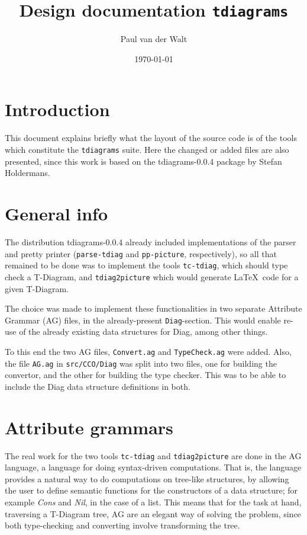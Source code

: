 \documentclass[a4paper]{article}
\title{Design documentation \texttt{tdiagrams}}
\date{\today}
\author{Paul van der Walt}
\begin{document}
\maketitle

\section{Introduction}

This document explains briefly what the layout of the source code is of the
tools which constitute the \texttt{tdiagrams} suite. Here the changed or added
files are also presented, since this work is based on the tdiagrams-0.0.4
package by Stefan Holdermans. 

\section{General info}

The distribution tdiagrams-0.0.4 already included implementations of the parser and pretty printer (\texttt{parse-tdiag} and \texttt{pp-picture}, respectively), so all that remained to be done was to implement the tools \texttt{tc-tdiag}, which should type check a T-Diagram, and \texttt{tdiag2picture} which would generate \LaTeX\ code for a given T-Diagram.

The choice was made to implement these functionalities in two separate Attribute Grammar (AG) files, in the already-present \texttt{Diag}-section. This would enable re-use of the already existing data structures for Diag, among other things. 

To this end the two AG files, \texttt{Convert.ag} and \texttt{TypeCheck.ag} were added. Also, the file \texttt{AG.ag} in \texttt{src/CCO/Diag} was split into two files, one for building the convertor, and the other for building the type checker. This was to be able to include the Diag data structure definitions in both. 

\section{Attribute grammars}

The real work for the two tools \texttt{tc-tdiag} and \texttt{tdiag2picture} are done in the AG language, a language for doing syntax-driven computations. That is, the language provides a natural way to do computations on tree-like structures, by allowing the user to define semantic functions for the constructors of a data structure; for example \emph{Cons} and \emph{Nil}, in the case of a list. This means that for the task at hand, traversing a T-Diagram tree, AG are an elegant way of solving the problem, since both type-checking and converting involve transforming the tree.
\end{document}
